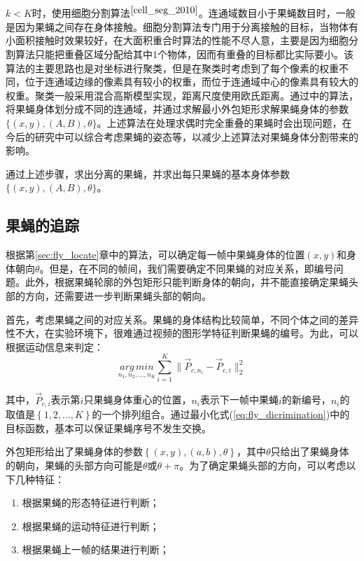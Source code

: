 $k<K$时，使用细胞分割算法${}^{\cite{cell_seg_2010}}$。连通域数目小于果蝇数目时，一般是因为果蝇之间存在身体接触。细胞分割算法专门用于分离接触的目标，当物体有小面积接触时效果较好，在大面积重合时算法的性能不尽人意，主要是因为细胞分割算法只能把重叠区域分配给其中1个物体，因而有重叠的目标都比实际要小。该算法的主要思路也是对坐标进行聚类，但是在聚类时考虑到了每个像素的权重不同，位于连通域边缘的像素具有较小的权重，而位于连通域中心的像素具有较大的权重。聚类一般采用混合高斯模型实现，距离尺度使用欧氏距离。通过\cite{cell_seg_2010}中的算法，将果蝇身体划分成不同的连通域，并通过求解最小外包矩形求解果蝇身体的参数$\{(x, y), (A, B), \theta\}$。上述算法在处理求偶时完全重叠的果蝇时会出现问题，在今后的研究中可以综合考虑果蝇的姿态等，以减少上述算法对果蝇身体分割带来的影响。

通过上述步骤，求出分离的果蝇，并求出每只果蝇的基本身体参数$\{(x, y), (A, B), \theta\}$。

\subsection{果蝇的追踪}\label{sec:fly_track}

根据第\ref{sec:fly_locate}章中的算法，可以确定每一帧中果蝇身体的位置$(x, y)$和身体朝向$\theta$。但是，在不同的帧间，我们需要确定不同果蝇的对应关系，即编号问题。此外，根据果蝇轮廓的外包矩形只能判断身体的朝向，并不能直接确定果蝇头部的方向，还需要进一步判断果蝇头部的朝向。

首先，考虑果蝇之间的对应关系。果蝇的身体结构比较简单，不同个体之间的差异性不大，在实验环境下，很难通过视频的图形学特征判断果蝇的编号。为此，可以根据运动信息来判定：
\begin{equation}\label{eq:fly_dicrimination}
\underset{n_{1},n_2, \ldots, n_K}{arg\,min}
\sum_{i=1}^K\|\vec{P}_{c, n_i} - \vec{P}_{c, i}\|_2^2
\end{equation}

其中，$\vec{P}_{c, i}$表示第$i$只果蝇身体重心的位置，$n_i$表示下一帧中果蝇$i$的新编号，$n_i$的取值是$\left\{1,2,\ldots,K\right\}$的一个排列组合。通过最小化式(\ref{eq:fly_dicrimination})中的目标函数，基本可以保证果蝇序号不发生交换。

外包矩形给出了果蝇身体的参数$\left\{(x, y), (a, b), \theta\right\}$，其中$\theta$只给出了果蝇身体的朝向，果蝇的头部方向可能是$\theta$或$\theta+\pi$。为了确定果蝇头部的方向，可以考虑以下几种特征：
\begin{enumerate}
\item 根据果蝇的形态特征进行判断；
\item 根据果蝇的运动特征进行判断；
\item 根据果蝇上一帧的结果进行判断；
\end{enumerate}

